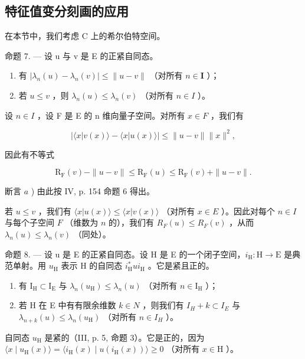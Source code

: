 \subsection{特征值变分刻画的应用}

在本节中，我们考虑 C 上的希尔伯特空间。

命题 7. --- 设 u 与 v 是 E 的正紧自同态。

\begin{enumerate}
\def\labelenumi{\alph{enumi})}
\item
  有 \(|\lambda_n(u) - \lambda_n(v)|\leqslant \| u - v\|\) （对所有 \(n\in \mathbf{I}\) ）；
\item
  若 \(u \leqslant v\) ，则 \(\lambda_n(u) \leqslant \lambda_n(v)\) （对所有 \(n \in I\) ）。
\end{enumerate}

设 \(n \in I\) ，设 F 是 E 的 n 维向量子空间。对所有 \(x \in F\) ，我们有

\[
| \langle x | v (x) \rangle - \langle x | u (x) \rangle | \leqslant \| u - v \| \| x \| ^ {2},
\]

因此有不等式

\[
\mathrm{R} _ {\mathrm{F}} (v) - \| u - v \| \leqslant \mathrm{R} _ {\mathrm{F}} (u) \leqslant \mathrm{R} _ {\mathrm{F}} (v) + \| u - v \|.
\]

断言 \(a\) ) 由此按 IV, p. 154 命题 6 得出。

若 \(u \leqslant v\) ，我们有 \(\langle x | u(x) \rangle \leqslant \langle x | v(x) \rangle\) （对所有 \(x \in E\) ）。因此对每个 \(n \in I\) 与每个子空间 \(F\) （维数为 \(n\) 的），我们有 \(R_F(u) \leqslant R_F(v)\) ，从而 \(\lambda_n(u) \leqslant \lambda_n(v)\) （同处）。

命题 8. --- 设 u 是 E 的正紧自同态。设 H 是 E 的一个闭子空间，\(i_{\mathrm{H}}: \mathrm{H} \to \mathrm{E}\) 是典范单射。用 \(u_{\mathrm{H}}\) 表示 H 的自同态 \(i_{\mathrm{H}}^{*}ui_{\mathrm{H}}\) 。它是紧且正的。

\begin{enumerate}
\def\labelenumi{\alph{enumi})}
\item
  有 \(\mathrm{I_H}\subset \mathrm{I_E}\) 与 \(\lambda_n(u_{\mathrm{H}})\leqslant \lambda_n(u)\) （对所有 \(n\in \mathrm{I_H}\) ）；
\item
  若 H 在 E 中有有限余维数 \(k \in N\) ，则我们有 \(I_{H} + k \subset I_{E}\) 与 \(\lambda_{n+k}(u) \leqslant \lambda_{n}(u_{\mathrm{H}})\) （对所有 \(n \in I_{H}\) ）。
\end{enumerate}

自同态 \(u_{\mathrm{H}}\) 是紧的（III, p. 5, 命题 3）。它是正的，因为 \(\langle x \mid u_{\mathrm{H}}(x) \rangle = \langle i_{\mathrm{H}}(x) \mid u(i_{\mathrm{H}}(x)) \rangle \geqslant 0\) （对所有 \(x \in \mathrm{H}\) ）。

